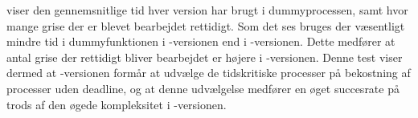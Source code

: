  viser den gennemsnitlige tid hver version har brugt i dummyprocessen, samt hvor mange grise der er blevet bearbejdet rettidigt. 
Som det ses bruges der væsentligt mindre tid i dummyfunktionen i -versionen end i -versionen. Dette medfører at antal grise der rettidigt bliver bearbejdet er højere i -versionen. Denne test viser dermed at -versionen formår at udvælge de tidskritiske processer på bekostning af processer uden deadline, og at denne udvælgelse medfører en øget succesrate på trods af den øgede kompleksitet i -versionen.

